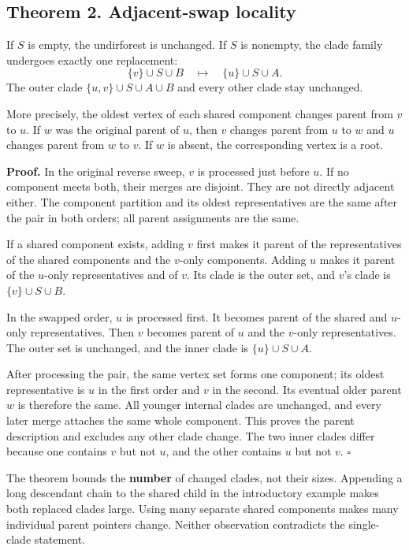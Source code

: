 \documentclass[
  11pt,
  letterpaper,
]{article}
\newcounter{none} %
\begin{document}
\subsection{Theorem 2. Adjacent-swap
locality}\label{theorem-2.-adjacent-swap-locality}

If \(S\) is empty, the undirforest is unchanged. If \(S\) is nonempty,
the clade family undergoes exactly one replacement: \[
           \{v\}\cup S\cup B
                 \quad\longmapsto\quad
           \{u\}\cup S\cup A.
\] The outer clade \(\{u,v\}\cup S\cup A\cup B\) and every other clade
stay unchanged.

More precisely, the oldest vertex of each shared component changes
parent from \(v\) to \(u\). If \(w\) was the original parent of \(u\),
then \(v\) changes parent from \(u\) to \(w\) and \(u\) changes parent
from \(w\) to \(v\). If \(w\) is absent, the corresponding vertex is a
root.

\textbf{Proof.} In the original reverse sweep, \(v\) is processed just
before \(u\). If no component meets both, their merges are disjoint.
They are not directly adjacent either. The component partition and its
oldest representatives are the same after the pair in both orders; all
parent assignments are the same.

If a shared component exists, adding \(v\) first makes it parent of the
representatives of the shared components and the \(v\)-only components.
Adding \(u\) makes it parent of the \(u\)-only representatives and of
\(v\). Its clade is the outer set, and \(v\)'s clade is
\(\{v\}\cup S\cup B\).

In the swapped order, \(u\) is processed first. It becomes parent of the
shared and \(u\)-only representatives. Then \(v\) becomes parent of
\(u\) and the \(v\)-only representatives. The outer set is unchanged,
and the inner clade is \(\{u\}\cup S\cup A\).

After processing the pair, the same vertex set forms one component; its
oldest representative is \(u\) in the first order and \(v\) in the
second. Its eventual older parent \(w\) is therefore the same. All
younger internal clades are unchanged, and every later merge attaches
the same whole component. This proves the parent description and
excludes any other clade change. The two inner clades differ because one
contains \(v\) but not \(u\), and the other contains \(u\) but not
\(v\). \hfill\(\square\)

The theorem bounds the \textbf{number} of changed clades, not their
sizes. Appending a long descendant chain to the shared child in the
introductory example makes both replaced clades large. Using many
separate shared components makes many individual parent pointers change.
Neither observation contradicts the single-clade statement.
\end{document}
